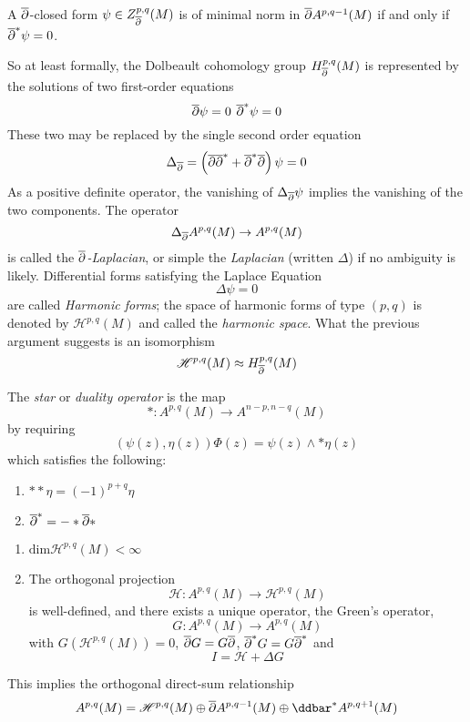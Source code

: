 \begin{lem}

	A $\overline{\partial}$-closed form $ \psi \in Z^{ p,q }_{ \overline{\partial} }(M)$ is of minimal norm in $ \overline{\partial} A^{ p,q-1 }(M)$ if and only if $ \overline{\partial}^* \psi = 0$.

\end{lem}

So at least formally, the Dolbeault cohomology group $ H^{ p,q }_{ \overline{\partial} }(M)$ is represented by the solutions of two first-order equations
\[
\overline{\partial} \psi = 0 \hspace{4pt} \overline{\partial}^* \psi = 0
\]
These two may be replaced by the single second order equation
\[
	\Delta_{ \overline{\partial} } = \left( \overline{\partial} \overline{\partial}^* + \overline{\partial}^* \overline{\partial} \right) \psi = 0
\]
As a positive definite operator, the vanishing of $ \Delta_{ \overline{\partial} } \psi$ implies the vanishing of the two components. The operator
\[
	\Delta_{ \overline{\partial} } A^{ p,q }(M) \to A^{ p,q }(M)
\]
is called the \textit{$\overline{\partial}$-Laplacian}, or simple the \textit{Laplacian} (written $ \Delta$) if no ambiguity is likely. Differential forms satisfying the Laplace Equation
\[
\Delta \psi = 0
\]
are called \textit{Harmonic forms}; the space of harmonic forms of type $ \left( p,q \right)$ is denoted by $ \mathscr{H}^{ p,q }(M)$ and called the \textit{harmonic space}. What the previous argument suggests is an isomorphism
\[
	\mathscr{H}^{ p,q }(M) \approx H^{ p,q }_{ \overline{\partial} }(M)
\]

\begin{defn}

The \textit{star} or \textit{duality operator} is the map
\[
	*: A^{ p,q }(M) \to A^{ n-p, n-q }(M)
\]
by requiring
\[
	\left( \psi(z), \eta(z) \right) \Phi(z) = \psi(z) \wedge * \eta(z)
\]
which satisfies the following:
\begin{enumerate}
	\item $ ** \eta = (-1)^{ p+q } \eta$
	\item $ \overline{\partial}^* = - * \overline{\partial} *$
\end{enumerate}


\end{defn}

\begin{thm}

\begin{enumerate}
	\item $ \mathrm{dim} \mathscr{H}^{ p,q }(M) < \infty$
	\item The orthogonal projection
		\[
			\mathscr{H}: A^{ p,q }(M) \to \mathscr{H}^{ p,q }(M)
		\]
		is well-defined, and there exists a unique operator, the Green's operator,
		\[
			G: A^{ p,q }(M) \to A^{ p,q }(M)
		\]
		with $ G( \mathscr{H}^{ p,q }(M)) = 0$, $\overline{\partial} G = G \overline{\partial}$, $ \overline{\partial}^* G = G \overline{\partial}^*$ and
		\[
		I = \mathscr{H} + \Delta G
		\]
		
\end{enumerate}

This implies the orthogonal direct-sum relationship
\[
	A^{ p,q }(M) = \mathscr{H}^{ p,q }(M) \oplus \dbar A^{ p,q-1 }(M) \oplus \ddbar^* A^{ p,q+1 }(M)
\]


\end{thm}

